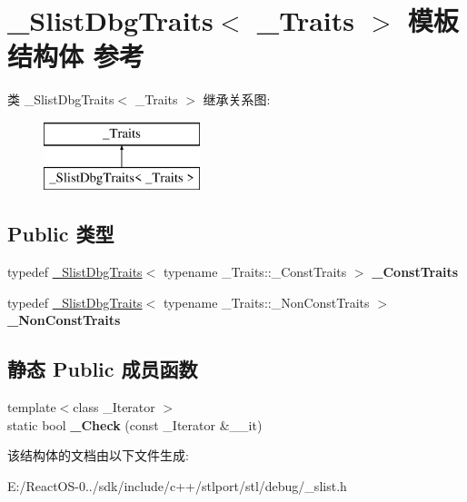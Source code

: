 \hypertarget{struct___slist_dbg_traits}{}\section{\+\_\+\+Slist\+Dbg\+Traits$<$ \+\_\+\+Traits $>$ 模板结构体 参考}
\label{struct___slist_dbg_traits}
类 \+\_\+\+Slist\+Dbg\+Traits$<$ \+\_\+\+Traits $>$ 继承关系图\+:\begin{figure}[H]
\begin{center}
\leavevmode
\includegraphics[height=2.000000cm]{struct___slist_dbg_traits}
\end{center}
\end{figure}
\subsection*{Public 类型}
\begin{DoxyCompactItemize}
\item 
\mbox{\label{struct___slist_dbg_traits_a5476d68e2d533a0f0f522dc771665d25}} 
typedef \hyperlink{struct___slist_dbg_traits}{\+\_\+\+Slist\+Dbg\+Traits}$<$ typename \+\_\+\+Traits\+::\+\_\+\+Const\+Traits $>$ {\bfseries \+\_\+\+Const\+Traits}
\item 
\mbox{\label{struct___slist_dbg_traits_a523ccbf0a708f9ff51456c8aeaed485d}} 
typedef \hyperlink{struct___slist_dbg_traits}{\+\_\+\+Slist\+Dbg\+Traits}$<$ typename \+\_\+\+Traits\+::\+\_\+\+Non\+Const\+Traits $>$ {\bfseries \+\_\+\+Non\+Const\+Traits}
\end{DoxyCompactItemize}
\subsection*{静态 Public 成员函数}
\begin{DoxyCompactItemize}
\item 
\mbox{\label{struct___slist_dbg_traits_a3058e3d5853e7cc44ee30e2036f94e3a}} 
{\footnotesize template$<$class \+\_\+\+Iterator $>$ }\\static bool {\bfseries \+\_\+\+Check} (const \+\_\+\+Iterator \&\+\_\+\+\_\+it)
\end{DoxyCompactItemize}


该结构体的文档由以下文件生成\+:\begin{DoxyCompactItemize}
\item 
E\+:/\+React\+O\+S-\/0../sdk/include/c++/stlport/stl/debug/\+\_\+slist.\+h\end{DoxyCompactItemize}
